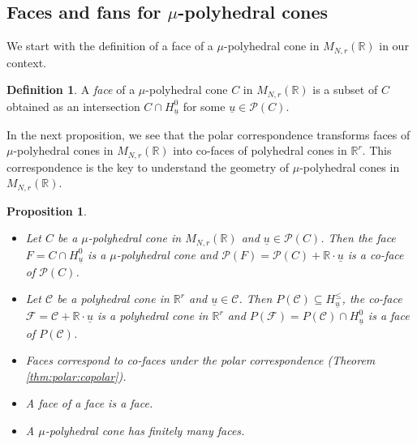 \documentclass[12pt, a4article]{amsart}   	%
\numberwithin{equation}{section}
\theoremstyle{plain}
\newtheorem{proposition}[theorem]{Proposition}
\theoremstyle{definition}
\newtheorem{definition}[theorem]{Definition}
\newcommand{\R}{{\mathbb R}}
\newcommand{\mcC}{{\mathcal C}}
\newcommand{\mcF}{{\mathcal F}}
\newcommand{\mcP}{{\mathcal P}}
\newcommand{\uu}{{\underline u}}
\newcommand{\MNaR}{M_{N,r}(\R)}
\begin{document}

\subsection{Faces and fans for $\mu$-polyhedral cones}

We start with the definition of a face of a $\mu$-polyhedral cone in $\MNaR$ in our context.

\begin{definition}\label{def:face}
A \emph{face} of a $\mu$-polyhedral cone $C$ in $\MNaR$ is a subset of $C$ obtained as an intersection $C\cap H_{\uu}^0$ for some $\uu\in \mathcal{P}(C)$.
\end{definition}

In the next proposition, we see that the polar correspondence transforms faces of $\mu$-polyhedral cones in $\MNaR$ into co-faces of polyhedral cones in $\R^r$. This correspondence is the key to understand the geometry of $\mu$-polyhedral cones in $\MNaR$.
\begin{proposition}\label{prp:face:coface}
\begin{itemize}
\item[(i)] Let $C$ be a $\mu$-polyhedral cone in $\MNaR$ and $\uu\in\mathcal{P}(C)$. Then the face 
$F = C\cap H_{\uu}^0$ is a $\mu$-polyhedral cone and $\mcP(F) = \mcP(C) + \R\cdot\uu$ is a co-face of $\mcP(C)$.
\item[(ii)] Let $\mcC$ be a polyhedral cone in $\R^r$ and $\uu\in\mcC$. Then $P(\mathcal{C})\subseteq H_{\underline{u}}^{\leq}$, the co-face $\mcF=\mcC + \R\cdot\uu$ is a polyhedral cone in $\R^r$ and $P(\mcF) = P(\mcC)\cap H_{\uu}^0$ is a face of $P(\mcC)$. 
\item[(iii)] Faces correspond to co-faces under the polar correspondence (Theorem \ref{thm:polar:copolar}).
\item[(iv)] A face of a face is a face.
\item[(v)] A $\mu$-polyhedral cone has finitely many faces.
\end{itemize}
\end{proposition}
\end{document}
